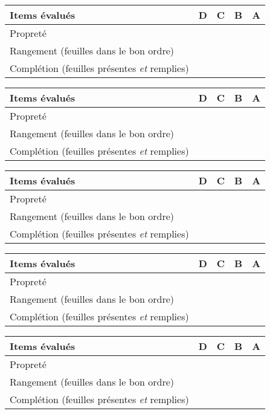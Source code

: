\newcommand{\competenceClasseur}{
\begin{center}
  \setlength{\extrarowheight}{6pt}
  \begin{tabular}{| l | c | c | c | c |}
    \hline
    \rowcolor{gray!20} 
    \textbf{Items évalués} & D & C & B & A
    \\ \hline
    Propreté  & & & &
    \\ \hline
    Rangement (feuilles dans le bon ordre) & & & &
    \\ \hline
    Complétion (feuilles présentes \textit{et} remplies) & & & & 
    \\ \hline
  \end{tabular}
\end{center}
}

\pasDePagination

\competenceClasseur
\bigskip
\competenceClasseur
\bigskip
\competenceClasseur
\bigskip
\competenceClasseur
\bigskip
\competenceClasseur